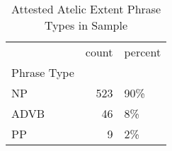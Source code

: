\begin{table}[htbp!]
\centering
\caption{Attested Atelic Extent Phrase Types in Sample}
\label{table:atel_phtype_ct}
\begin{tabular}{lrl}
\toprule
{} &  count & percent \\
Phrase Type &        &         \\
\midrule
NP          &    523 &     90\% \\
ADVB        &     46 &      8\% \\
PP          &      9 &      2\% \\
\bottomrule
\end{tabular}
\end{table}
